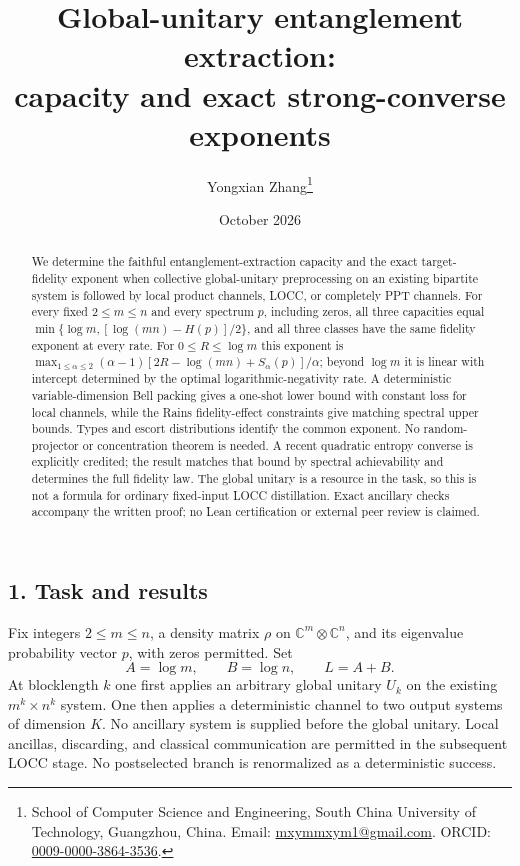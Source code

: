 \documentclass[11pt]{article}
\title{Global-unitary entanglement extraction:\\capacity and exact strong-converse exponents}
\author{Yongxian Zhang\thanks{School of Computer Science and Engineering, South China University of Technology, Guangzhou, China. Email: \href{mailto:mxymmxym1@gmail.com}{mxymmxym1@gmail.com}. ORCID: \href{https://orcid.org/0009-0000-3864-3536}{0009-0000-3864-3536}.}}
\date{October 2026}
\begin{document}
\maketitle
\begin{abstract}
We determine the faithful entanglement-extraction capacity and the exact target-fidelity exponent when collective global-unitary preprocessing on an existing bipartite system is followed by local product channels, LOCC, or completely PPT channels. For every fixed $2\le m\le n$ and every spectrum $p$, including zeros, all three capacities equal
$\min\{\log m,[\log(mn)-H(p)]/2\}$, and all three classes have the same fidelity exponent at every rate.
For $0\le R\le\log m$ this exponent is
$\max_{1\le\alpha\le2}(\alpha-1)[2R-\log(mn)+S_\alpha(p)]/\alpha$;
beyond $\log m$ it is linear with intercept determined by the optimal logarithmic-negativity rate. A deterministic variable-dimension Bell packing gives a one-shot lower bound with constant loss for local channels, while the Rains fidelity-effect constraints give matching spectral upper bounds. Types and escort distributions identify the common exponent. No random-projector or concentration theorem is needed. A recent quadratic entropy converse is explicitly credited; the result matches that bound by spectral achievability and determines the full fidelity law. The global unitary is a resource in the task, so this is not a formula for ordinary fixed-input LOCC distillation. Exact ancillary checks accompany the written proof; no Lean certification or external peer review is claimed.
\end{abstract}

\hypertarget{task-and-results}{%
\subsection{1. Task and results}\label{task-and-results}}

Fix integers \(2\le m\le n\), a density matrix \(\rho\) on \(\mathbb C^m\otimes\mathbb C^n\), and its eigenvalue probability vector \(p\), with zeros permitted. Set \[
 A=\log m,\qquad B=\log n,\qquad L=A+B.
 \tag{1}
\] At blocklength \(k\) one first applies an arbitrary global unitary \(U_k\) on the existing \(m^k\times n^k\) system. One then applies a deterministic channel to two output systems of dimension \(K\). No ancillary system is supplied before the global unitary. Local ancillas, discarding, and classical communication are permitted in the subsequent LOCC stage. No postselected branch is renormalized as a deterministic success.
\end{document}
